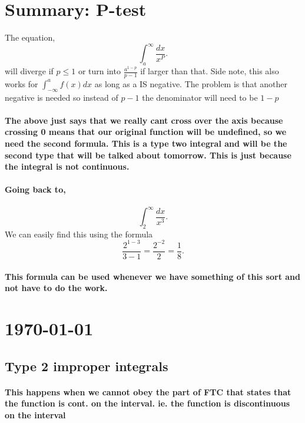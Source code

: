 \documentclass[a4paper]{article}
\begin{document}
\section{Summary: P-test}%
\label{sec:Summary: P-test}

The equation,
\[
\int_{a}^{\infty} \frac{dx}{x^{P}} 
.\] 
will diverge if $p\le 1$ or turn into $\frac{a^{1-p}}{p-1}$ if larger than that. Side note, this also works for $\int_{-\infty}^{a} f(x)dx $ as long as a IS negative. The problem is that another negative is needed so instead of $p-1$ the denominator will need to be $1-p$ 

\paragraph{The above just says that we really cant cross over the axis because crossing 0 means that our original function will be undefined, so we need the second formula. This is a type two integral and will be the second type that will be talked about tomorrow. This is just because the integral is not continuous.}

\paragraph{Going back to, }

\[
\int_{2}^{\infty} \frac{dx}{x^3} 
.\] 
We can easily find this using the formula
\[
  \frac{2^{1-3}}{3-1}= \frac{2^{-2}}{2}=\frac{1}{8}
.\] 
\paragraph{This formula can be used whenever we have something of this sort and not have to do the work.  }

\section{\today}%
\label{sec:\today}
\subsection{Type 2 improper integrals}%
\label{sub:Type 2 improper integrals}
\paragraph{This happens when we cannot obey the part of FTC that states that the function is cont. on the interval. ie. the function is discontinuous on the interval}
\end{document}

